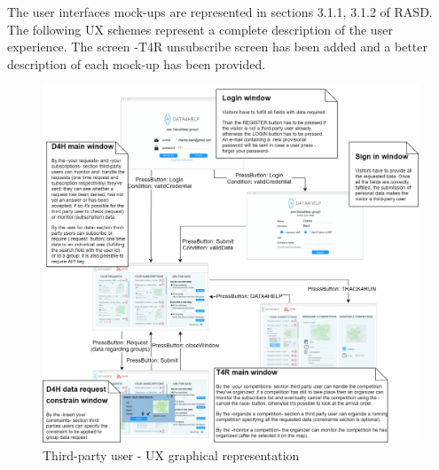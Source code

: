 The user interfaces mock-ups are represented in sections 3.1.1, 3.1.2 of RASD. The following UX schemes represent a complete description of the user experience. The screen -T4R unsubscribe screen has been added and a better description of each mock-up has been provided.
\begin{figure}[H]
\caption{Third-party user - UX graphical representation}
\includegraphics[width = \textwidth]{sections/userInterfacesGraphs/UserExperienceDesktop.png}
\end{figure}
\clearpage
